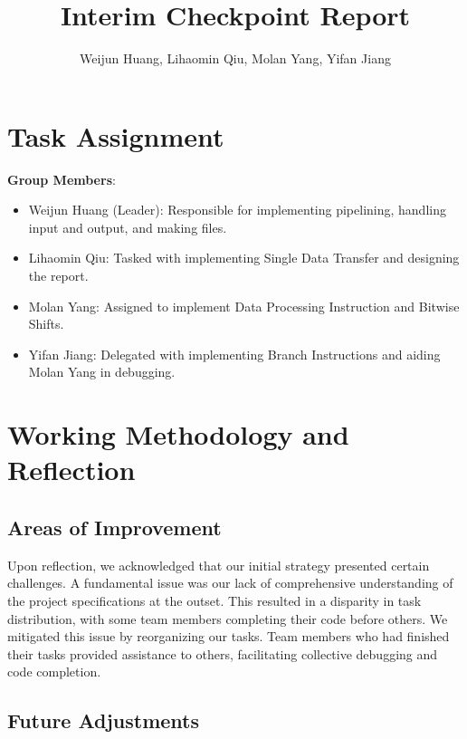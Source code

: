 \documentclass[11pt]{article}
\begin{document}
\title{Interim Checkpoint Report}
\author{Weijun Huang, Lihaomin Qiu, Molan Yang, Yifan Jiang}

\maketitle

\section*{Task Assignment}

\textbf{Group Members}:

\begin{itemize}
  \item Weijun Huang (Leader): Responsible for implementing pipelining, handling input and output, and making files.
  \item Lihaomin Qiu: Tasked with implementing Single Data Transfer and designing the report.
  \item Molan Yang: Assigned to implement Data Processing Instruction and Bitwise Shifts.
  \item Yifan Jiang: Delegated with implementing Branch Instructions and aiding Molan Yang in debugging.
\end{itemize}

\section*{Working Methodology and Reflection}

\subsection*{Areas of Improvement}

Upon reflection, we acknowledged that our initial strategy presented certain challenges. A fundamental issue was our lack of comprehensive understanding of the project specifications at the outset. This resulted in a disparity in task distribution, with some team members completing their code before others. We mitigated this issue by reorganizing our tasks. Team members who had finished their tasks provided assistance to others, facilitating collective debugging and code completion.

\subsection*{Future Adjustments}
\end{document}
